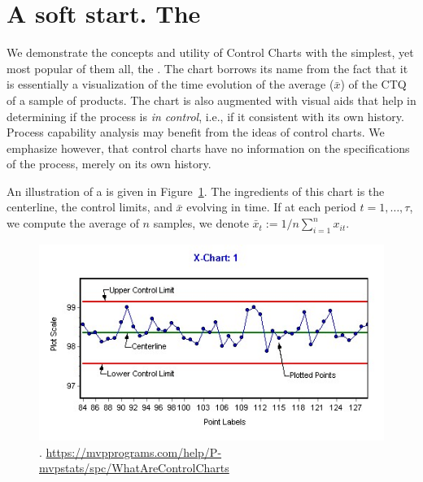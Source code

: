 \section{A soft start. The \barxChart}




We demonstrate the concepts and utility of Control Charts with the simplest, yet most popular of them all, the \barxChart. 
The chart borrows its name from the fact that it is essentially a visualization of the time evolution of the average ($\bar{x}$) of the CTQ of a sample of products. 
The chart is also augmented with visual aids that help in determining if the process is \emph{in control}, i.e., if it consistent with its own history. 
Process capability analysis may benefit from the ideas of control charts. We emphasize however, that control charts have no information on the specifications of the process, merely on its own history.

An illustration of a \barxChart is given in Figure~\ref{fig:bar_x_chart}. 
The ingredients of this chart is the centerline, the control limits, and $\bar{x}$ evolving in time. 
If at each period $t=1,\dots,\tau$, we compute the average of $n$ samples, we denote $\bar{x}_t:=1/n \sum_{i=1}^n x_{it}$.

\begin{figure}[h]
\centering
\includegraphics[height=0.3\textheight]{art/X-chartExample}
\caption[\barxChart]{\barxChart. \newline \url{https://mvpprograms.com/help/P-mvpstats/spc/WhatAreControlCharts}}
\label{fig:bar_x_chart}
\end{figure}






